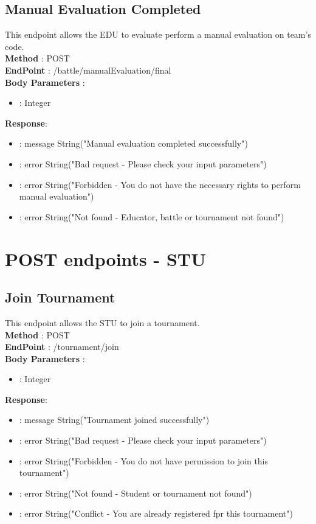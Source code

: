 \subsection*{Manual Evaluation Completed}
This endpoint allows the EDU to evaluate perform a manual evaluation on team's code.\\
\textbf{Method} : POST \\
\textbf{EndPoint} : /battle/manualEvaluation/final \\
\textbf{Body Parameters} :
\begin{itemize}
    \item {} : Integer
\end{itemize}
\textbf{Response}:
\begin{itemize}
    \item {} : message String("Manual evaluation completed successfully")
    \item {} : error String("Bad request - Please check your input parameters")
    \item {} : error String("Forbidden - You do not have the necessary rights to perform manual evaluation")
    \item {} : error String("Not found - Educator, battle or tournament not found")
\end{itemize}

\section*{POST endpoints - STU}
\subsection*{Join Tournament}
This endpoint allows the STU to join a tournament.\\
\textbf{Method} : POST \\
\textbf{EndPoint} : /tournament/join \\
\textbf{Body Parameters} :
\begin{itemize}
    \item {} : Integer
\end{itemize}
\textbf{Response}:
\begin{itemize}
    \item {} : message String("Tournament joined successfully")
    \item {} : error String("Bad request - Please check your input parameters")
    \item {} : error String("Forbidden - You do not have permission to join this tournament")
    \item {} : error String("Not found - Student or tournament not found")
    \item {} : error String("Conflict - You are already registered fpr this tournament")
\end{itemize}

